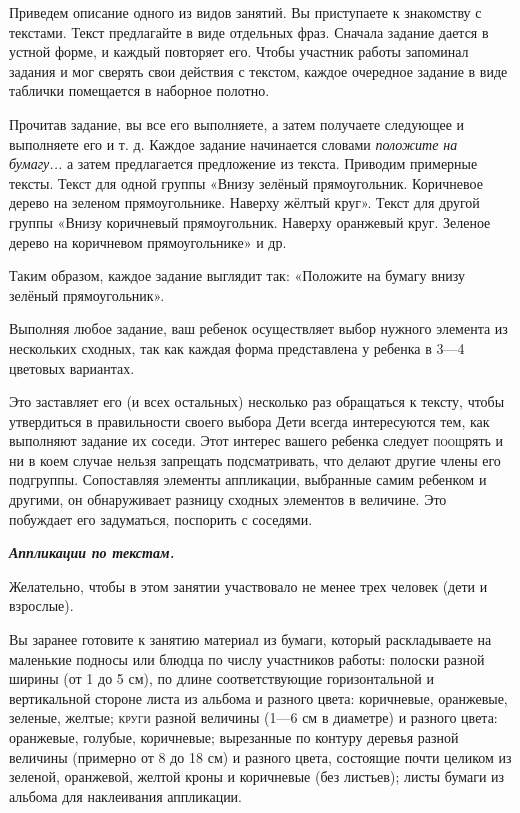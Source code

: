 \documentclass{book}
\renewcommand{\emph}[1]{\textit{#1}}
\begin{document}
Приведем описание одного из видов занятий. Вы приступаете к знакомству с
текстами. Текст предлагайте в виде отдельных фраз. Сначала задание
дается в устной форме, и каждый повторяет его. Чтобы участник работы
запоминал задания и мог сверять свои действия с текстом, каждое
очередное задание в виде таблички помещается в наборное полотно.

Прочитав задание, вы все его выполняете, а затем получаете следующее и
выполняете его и т. д. Каждое задание начинается словами \emph{положите
на бумагу...} а затем предлагается предложение из текста. Приводим
примерные тексты. Текст для одной группы «Внизу зелёный прямоугольник.
Коричневое дерево на зеленом прямоугольнике. Наверху жёлтый круг». Текст
для другой группы «Внизу коричневый прямоугольник. Наверху оранжевый
круг. Зеленое дерево на коричневом прямоугольнике» и др.

Таким образом, каждое задание выглядит так: «Положите на бумагу внизу
зелёный прямоугольник».

Выполняя любое задание, ваш ребенок осуществляет выбор нужного элемента
из нескольких сходных, так как каждая форма представлена у ребенка в
3---4 цветовых вариантах.

Это заставляет его (и всех остальных) несколько раз обращаться к тексту,
чтобы утвердиться в правильности своего выбора Дети всегда интересуются
тем, как выполняют задание их соседи. Этот интерес вашего ребенка
следует \textsc{поощ}рять и ни в коем случае нельзя запрещать
подсматривать, что делают другие члены его подгруппы. Сопоставляя
элементы аппликации, выбранные самим ребенком и другими, он обнаруживает
разницу сходных элементов в величине. Это побуждает его задуматься,
поспорить с соседями.

\emph{\textbf{Аппликации по текстам.}}

Желательно, чтобы в этом занятии участвовало не менее трех человек (дети
и взрослые).

Вы заранее готовите к занятию материал из бумаги, который раскладываете
на маленькие подносы или блюдца по числу участников работы: полоски
разной ширины (от 1 до 5 см), по длине соответствующие горизонтальной и
вертикальной стороне листа из альбома и разного цвета: коричневые,
оранжевые, зеленые, желтые; \textsc{круги} разной величины (1---6 см в
диаметре) и разного цвета: оранжевые, голубые, коричневые; вырезанные по
контуру деревья разной величины (примерно от 8 до 18 см) и разного
цвета, состоящие почти целиком из зеленой, оранжевой, желтой кроны и
коричневые (без листьев); листы бумаги из альбома для наклеивания
аппликации.
\end{document}
